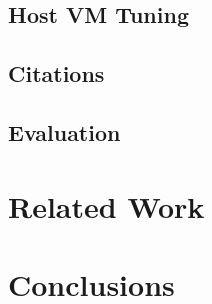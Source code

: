 \documentclass{acm_proc_article-sp}
\begin{document}
\subsection{Host VM Tuning}

\subsection{Citations}

\subsection{Evaluation}

\section{Related Work}

\section{Conclusions}


\end{document}
